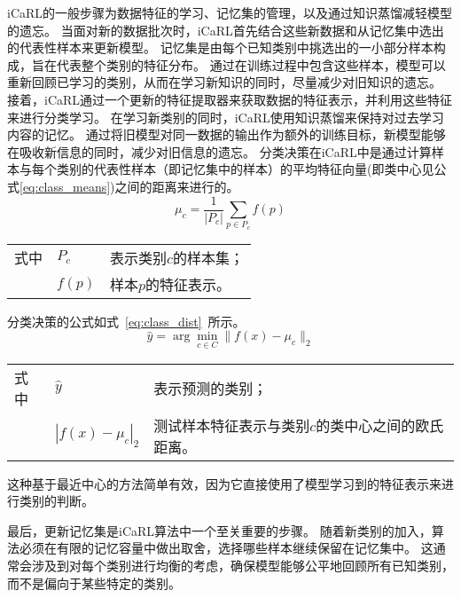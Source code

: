 iCaRL的一般步骤为数据特征的学习、记忆集的管理，以及通过知识蒸馏减轻模型的遗忘。
当面对新的数据批次时，iCaRL首先结合这些新数据和从记忆集中选出的代表性样本来更新模型。
记忆集是由每个已知类别中挑选出的一小部分样本构成，旨在代表整个类别的特征分布。
通过在训练过程中包含这些样本，模型可以重新回顾已学习的类别，从而在学习新知识的同时，尽量减少对旧知识的遗忘。
接着，iCaRL通过一个更新的特征提取器来获取数据的特征表示，并利用这些特征来进行分类学习。
在学习新类别的同时，iCaRL使用知识蒸馏来保持对过去学习内容的记忆。
通过将旧模型对同一数据的输出作为额外的训练目标，新模型能够在吸收新信息的同时，减少对旧信息的遗忘。
分类决策在iCaRL中是通过计算样本与每个类别的代表性样本（即记忆集中的样本）的平均特征向量(即类中心见公式\ref{eq:class_means})之间的距离来进行的。
\begin{equation}
	\label{eq:class_means}
	\mu_c = \frac{1}{|P_c|} \sum_{p \in P_c} f(p)
\end{equation}
\begin{flushleft}
	\renewcommand\arraystretch{1.25}
	\begin{tabularx}{\textwidth}{@{}>{\normalsize\rm}l@{\quad}>{\normalsize\rm}l@{——}>{\normalsize\rm}X@{}}
		式中 & $P_c$  & 表示类别$c$的样本集； \\
		   & $f(p)$ & 样本$p$的特征表示。  \\
	\end{tabularx}\vspace{.5ex}%
\end{flushleft}
分类决策的公式如式~\ref{eq:class_dist}~所示。
\begin{equation}
	\label{eq:class_dist}
	\hat{y} = \arg\min_{c \in C} \|f(x) - \mu_c\|_2
\end{equation}
\begin{flushleft}
	\renewcommand\arraystretch{1.25}
	\begin{tabularx}{\textwidth}{@{}>{\normalsize\rm}l@{\quad}>{\normalsize\rm}l@{——}>{\normalsize\rm}X@{}}
		式中 & $\hat{y}$          & 表示预测的类别；                   \\
		   & $|f(x) - \mu_c|_2$ & 测试样本特征表示与类别$c$的类中心之间的欧氏距离。 \\
	\end{tabularx}\vspace{.5ex}%
\end{flushleft}
这种基于最近中心的方法简单有效，因为它直接使用了模型学习到的特征表示来进行类别的判断。

最后，更新记忆集是iCaRL算法中一个至关重要的步骤。
随着新类别的加入，算法必须在有限的记忆容量中做出取舍，选择哪些样本继续保留在记忆集中。
这通常会涉及到对每个类别进行均衡的考虑，确保模型能够公平地回顾所有已知类别，而不是偏向于某些特定的类别。\par


